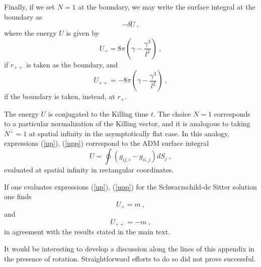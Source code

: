 \documentclass[a4paper,preprintnumbers,amsmath,amssymb]{revtex4}
\begin{document}
Finally, if we set $N=1$ at the boundary, we may write the surface integral
at the boundary as
\begin{equation}
-\delta U \ ,
\label{}
\end{equation}
where the energy $U$ is given by
\begin{equation}
U_+= 8\pi \left( \gamma - \frac{\gamma^3}{l^2} \right) \ ,
\label{up}
\end{equation}
if $r_{++}$ is taken as the boundary, and
\begin{equation}
U_{++}= -8\pi \left( \gamma - \frac{\gamma^3}{l^2} \right) \ ,
\label{upp}
\end{equation}
if the boundary is taken, instead, at $r_+$.

The energy $U$ is conjugated to the Killing time $t$. The choice $N=1$ corresponds to
a particular normalization of the Killing vector, and it is analogous to taking $N^\perp=1$
at spatial infinity in the asymptotically flat case. In this analogy, expressions (\ref{up}), (\ref{upp})
correspond to the ADM surface integral
\begin{equation}
U=\oint \left(g_{ij,i}-g_{ii,j}\right) dS_j \  ,
\label{adm}
\end{equation}
evaluated at spatial infinity in rectangular coordinates.

If one evaluates expressions (\ref{up}),  (\ref{upp})
for the Schwarzschild-de Sitter solution one finds
\begin{equation}
U_+ = m \ ,
\end{equation}
and
\begin{equation}
U_{++} = -m \ ,
\end{equation}
in agreement with the results stated  in the main text.

It would be interesting to develop a discussion along the lines of this appendix
in the presence of rotation. Straightforward efforts to do so did not prove successful.
\end{document}
